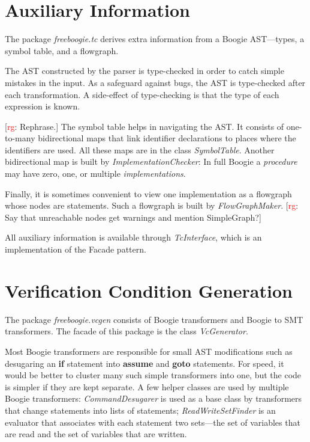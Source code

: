 \documentclass{llncs}
\newcommand{\rg}[1]{{\small [\textcolor{red}{rg}: #1]}}
\begin{document}
\section{Auxiliary Information} %

The package \textit{freeboogie.tc} derives extra information from
a Boogie AST---types, a symbol table, and a flowgraph.

The AST constructed by the parser is type-checked in order to
catch simple mistakes in the input. As a safeguard against bugs,
the AST is type-checked after each transformation. A side-effect
of type-checking is that the type of each expression is known.

\rg{Rephrase.}
The symbol table helps in navigating the AST\null. It consists of
one-to-many bidirectional maps that link identifier declarations
to places where the identifiers are used. All
these maps are in the class \textit{SymbolTable}.
Another bidirectional map is built by
\textit{ImplementationChecker}: In full Boogie a \emph{procedure}
may have zero, one, or multiple \emph{implementations}. 

Finally, it is sometimes convenient to view one implementation as a
flowgraph whose nodes are statements. Such a flowgraph is built by
\textit{FlowGraphMaker}. \rg{Say that unreachable nodes get warnings and
mention SimpleGraph?}

All auxiliary information is available through
\textit{TcInterface}, which is an implementation of the Facade
pattern.

\section{Verification Condition Generation} %

The package \textit{freeboogie.vcgen} consists of Boogie
transformers and Boogie to SMT transformers. The facade of this
package is the class \textit{VcGenerator}.

Most Boogie transformers are responsible for small AST
modifications such as desugaring an \textbf{if} statement
into \textbf{assume} and \textbf{goto} statements. For speed,
it would be better to cluster many such simple transformers
into one, but the code is simpler if they are kept
separate. A few helper classes are used by multiple Boogie
transformers: \textit{CommandDesugarer} is used as a base class
by transformers that change statements into lists of statements;
\textit{ReadWriteSetFinder} is an evaluator that associates with
each statement two sets---the set of variables that are read and
the set of variables that are written.
\end{document}
